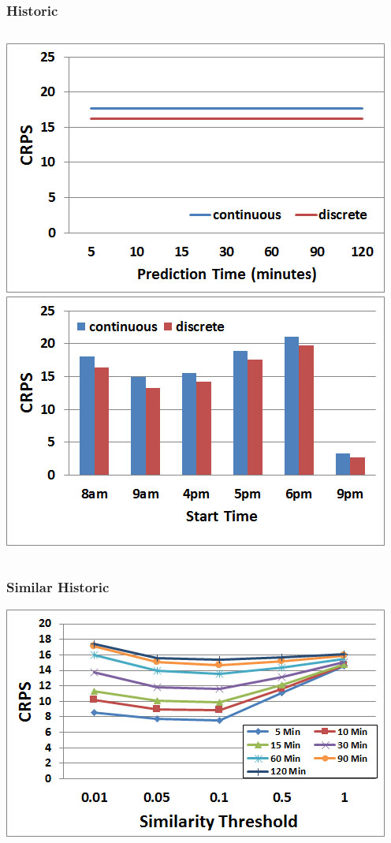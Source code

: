 \documentclass[t]{beamer}
\begin{document}
\begin{frame}\frametitle{Historic}
\vspace{0.5in}
\begin{columns}
		\includegraphics[scale=0.3]{Links_Historic.jpg}
		\includegraphics[scale=0.3]{Links_Historic_TOD.jpg}
\end{columns}
\end{frame}

\begin{frame}\frametitle{Similar Historic}
\begin{center}
	\includegraphics[scale=0.5]{Links_Filtered.jpg}
\end{center}
\end{frame}
\end{document}
